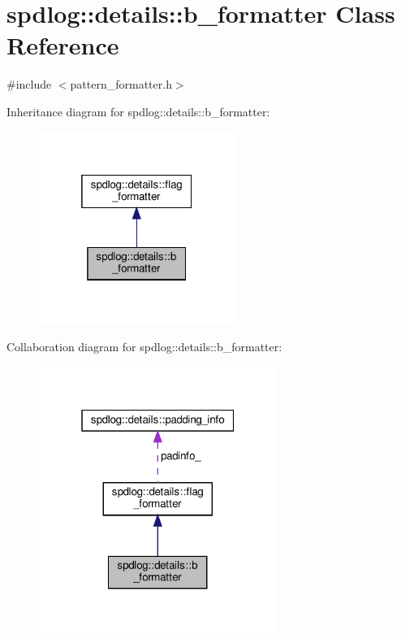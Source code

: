 \hypertarget{classspdlog_1_1details_1_1b__formatter}{}\section{spdlog\+:\+:details\+:\+:b\+\_\+formatter Class Reference}
\label{classspdlog_1_1details_1_1b__formatter}


{\ttfamily \#include $<$pattern\+\_\+formatter.\+h$>$}



Inheritance diagram for spdlog\+:\+:details\+:\+:b\+\_\+formatter\+:
\nopagebreak
\begin{figure}[H]
\begin{center}
\leavevmode
\includegraphics[width=181pt]{classspdlog_1_1details_1_1b__formatter__inherit__graph}
\end{center}
\end{figure}


Collaboration diagram for spdlog\+:\+:details\+:\+:b\+\_\+formatter\+:
\nopagebreak
\begin{figure}[H]
\begin{center}
\leavevmode
\includegraphics[width=220pt]{classspdlog_1_1details_1_1b__formatter__coll__graph}
\end{center}
\end{figure}

